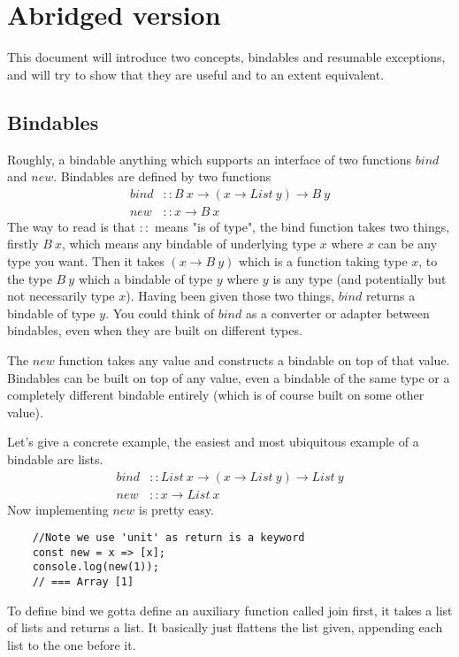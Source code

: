 \section{Abridged version}
This document will introduce two concepts,
bindables and resumable exceptions,
and will try to show that they are useful
and to an extent equivalent.

\subsection{Bindables}
Roughly, a bindable anything which supports an
interface of two functions $bind$ and $new$.
Bindables are defined by two functions
\begin{align}
    bind &:: B\ x \rightarrow (x \rightarrow List\ y) \rightarrow B\ y\\
    new &:: x \rightarrow B\ x
\end{align}
The way to read is that $::$ means "is of type",
the bind function takes two things,
firstly $B\ x$, which means any bindable of underlying type $x$
where $x$ can be any type you want.
Then it takes $(x \rightarrow B\ y)$ which
is a function taking type $x$,
to the type $B\ y$ which a bindable of type $y$
where $y$ is any type
(and potentially but not necessarily type $x$).
Having been given those two things,
$bind$ returns a bindable of type $y$.
You could think of $bind$ as a converter
or adapter between bindables,
even when they are built on different types.

The $new$ function takes any value and
constructs a bindable on top of that value.
Bindables can be built on top of any value,
even a bindable of the same type
or a completely different bindable entirely
(which is of course built on some other value).

Let's give a concrete example,
the easiest and most ubiquitous example of a bindable are lists.
\begin{align}
    bind &:: List\ x \rightarrow (x \rightarrow List\ y) \rightarrow List\ y\\
    new &:: x \rightarrow List\ x
\end{align}
Now implementing $new$ is pretty easy.
\begin{verbatim}
    //Note we use 'unit' as return is a keyword
    const new = x => [x];
    console.log(new(1));
    // === Array [1]
\end{verbatim}

To define bind we gotta define an auxiliary function called join first,
it takes a list of lists and returns a list.
It basically just flattens the list given,
appending each list to the one before it.

